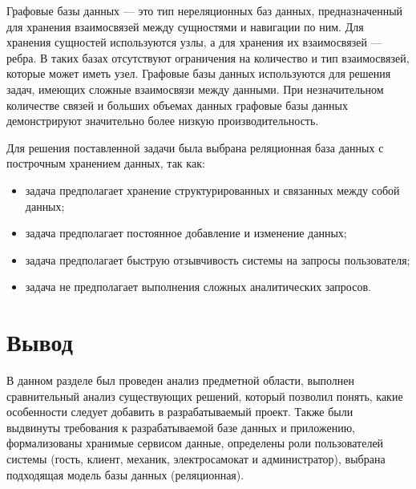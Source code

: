 Графовые базы данных --- это тип нереляционных баз данных, предназначенный для хранения взаимосвязей между сущностями и навигации по ним. Для хранения сущностей используются узлы, а для хранения их взаимосвязей --- ребра. В таких базах отсутствуют ограничения на количество и тип взаимосвязей, которые может иметь узел. Графовые базы данных используются для решения задач, имеющих сложные взаимосвязи между данными. При незначительном количестве связей и больших объемах данных графовые базы данных демонстрируют значительно более низкую производительность.

Для решения поставленной задачи была выбрана реляционная база данных с построчным хранением данных, так как:

\begin{itemize}
	\item задача предполагает хранение структурированных и связанных между собой данных;
	\item задача предполагает постоянное добавление и изменение данных;
	\item задача предполагает быструю отзывчивость системы на запросы пользователя;
	\item задача не предполагает выполнения сложных аналитических запросов.
\end{itemize}

\section*{Вывод}

В данном разделе был проведен анализ предметной области, выполнен сравнительный анализ существующих решений, который позволил понять, какие особенности следует добавить в разрабатываемый проект. Также были выдвинуты требования к разрабатываемой базе данных и приложению, формализованы хранимые сервисом данные, определены роли пользователей системы (гость, клиент, механик, электросамокат и администратор), выбрана подходящая модель базы данных (реляционная).